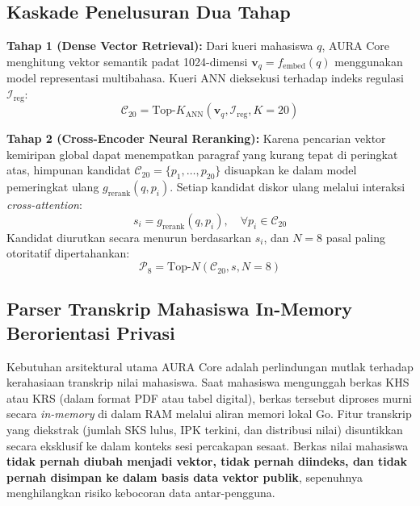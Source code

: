 \documentclass[conference]{IEEEtran}
\begin{document}
\subsection{Kaskade Penelusuran Dua Tahap}
\textbf{Tahap 1 (Dense Vector Retrieval):} Dari kueri mahasiswa $q$, AURA Core menghitung vektor semantik padat 1024-dimensi $\mathbf{v}_q = f_{\text{embed}}(q)$ menggunakan model representasi multibahasa. Kueri ANN dieksekusi terhadap indeks regulasi $\mathcal{I}_{\text{reg}}$:
\begin{equation}
\mathcal{C}_{20} = \text{Top-}K_{\text{ANN}}(\mathbf{v}_q, \mathcal{I}_{\text{reg}}, K=20)
\end{equation}

\textbf{Tahap 2 (Cross-Encoder Neural Reranking):} Karena pencarian vektor kemiripan global dapat menempatkan paragraf yang kurang tepat di peringkat atas, himpunan kandidat $\mathcal{C}_{20} = \{p_1, \dots, p_{20}\}$ disuapkan ke dalam model pemeringkat ulang $g_{\text{rerank}}(q, p_i)$. Setiap kandidat diskor ulang melalui interaksi \textit{cross-attention}:
\begin{equation}
s_i = g_{\text{rerank}}(q, p_i), \quad \forall p_i \in \mathcal{C}_{20}
\end{equation}
Kandidat diurutkan secara menurun berdasarkan $s_i$, dan $N=8$ pasal paling otoritatif dipertahankan:
\begin{equation}
\mathcal{P}_8 = \text{Top-}N(\mathcal{C}_{20}, s, N=8)
\end{equation}

\subsection{Parser Transkrip Mahasiswa In-Memory Berorientasi Privasi}
Kebutuhan arsitektural utama AURA Core adalah perlindungan mutlak terhadap kerahasiaan transkrip nilai mahasiswa. Saat mahasiswa mengunggah berkas KHS atau KRS (dalam format PDF atau tabel digital), berkas tersebut diproses murni secara \textit{in-memory} di dalam RAM melalui aliran memori lokal Go. Fitur transkrip yang diekstrak (jumlah SKS lulus, IPK terkini, dan distribusi nilai) disuntikkan secara eksklusif ke dalam konteks sesi percakapan sesaat. Berkas nilai mahasiswa \textbf{tidak pernah diubah menjadi vektor, tidak pernah diindeks, dan tidak pernah disimpan ke dalam basis data vektor publik}, sepenuhnya menghilangkan risiko kebocoran data antar-pengguna.
\end{document}
